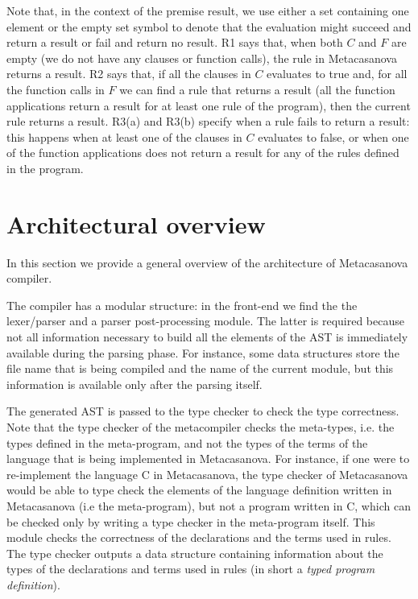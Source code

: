Note that, in the context of the premise result, we use either a set containing one element or the empty set symbol to denote that the evaluation might succeed and return a result or fail and return no result.
R1 says that, when both $C$ and $F$ are empty (we do not have any clauses or function calls), the rule in Metacasanova returns a result. R2 says that, if all the clauses in $C$ evaluates to true and, for all the function calls in $F$ we can find a rule that returns a result (all the function applications return a result for at least one rule of the program), then the current rule returns a result. R3(a) and R3(b) specify when a rule fails to return a result: this happens when at least one of the clauses in $C$ evaluates to false, or when one of the function applications does not return a result for any of the rules defined in the program.

\section{Architectural overview}
\label{sec:ch_metacasanova_architecture}
In this section we provide a general overview of the architecture of Metacasanova compiler.

The compiler has a modular structure: in the front-end we find the the lexer/parser and a parser post-processing module. The latter is required because not all information necessary to build all the elements of the AST is immediately available during the parsing phase. For instance, some data structures store the file name that is being compiled and the name of the current module, but this information is available only after the parsing itself. 

The generated AST is passed to the type checker to check the type correctness. Note that the type checker of the metacompiler checks the meta-types, i.e. the types defined in the meta-program, and not the types of the terms of the language that is being implemented in Metacasanova. For instance, if one were to re-implement the language C in Metacasanova, the type checker of Metacasanova would be able to type check the elements of the language definition written in Metacasanova (i.e the meta-program), but not a program written in C, which can be checked only by writing a type checker in the meta-program itself. This module checks the correctness of the declarations and the terms used in rules. The type checker outputs a data structure containing information about the types of the declarations and terms used in rules (in short a \textit{typed program definition}).

